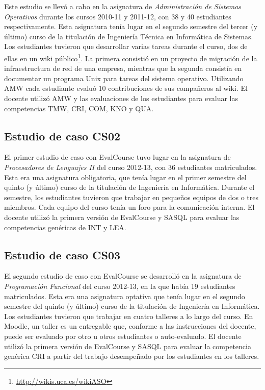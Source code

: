 		Este estudio se llevó a cabo en la asignatura de \emph{Administración de Sistemas Operativos} durante los cursos 2010-11 y 2011-12, con 38 y 40 estudiantes respectivamente. Esta asignatura tenía lugar en el segundo semestre del tercer (y último) curso de la titulación de Ingeniería Técnica en Informática de Sistemas. Los estudiantes tuvieron que desarrollar varias tareas durante el curso, dos de ellas en un wiki público\footnote{\url{http://wikis.uca.es/wikiASO}}. La primera consistió en un proyecto de migración de la infraestructura de red de una empresa, mientras que la segunda consistía en documentar un programa Unix para tareas del sistema operativo. Utilizando AMW cada estudiante evaluó 10 contribuciones de sus compañeros al wiki. El docente utilizó AMW y las evaluaciones de los estudiantes para evaluar las competencias TMW, CRI, COM, KNO y QUA.


	\subsection{Estudio de caso CS02}

		El primer estudio de caso con EvalCourse tuvo lugar en la asignatura de \emph{Procesadores de Lenguajes II} del curso 2012-13, con 36 estudiantes matriculados. Esta era una asignatura obligatoria, que tenía lugar en el primer semestre del quinto (y último) curso de la titulación de Ingeniería en Informática. Durante el semestre, los estudiantes tuvieron que trabajar en pequeños equipos de dos o tres miembros. Cada equipo del curso tenía un foro para la comunicación interna. El docente utilizó la primera versión de EvalCourse y SASQL para evaluar las competencias genéricas de INT y LEA.


	\subsection{Estudio de caso CS03}

		El segundo estudio de caso con EvalCourse se desarrolló en la asignatura de \emph{Programación Funcional} del curso 2012-13, en la que había 19 estudiantes matriculados. Esta era una asignatura optativa que tenía lugar en el segundo semestre del quinto (y último) curso de la titulación de Ingeniería en Informática. Los estudiantes tuvieron que trabajar en cuatro talleres a lo largo del curso. En Moodle, un taller es un entregable que, conforme a las instrucciones del docente, puede ser evaluado por otro u otros estudiantes o auto-evaluado. El docente utilizó la primera versión de EvalCourse y SASQL para evaluar la competencia genérica CRI a partir del trabajo desempeñado por los estudiantes en los talleres.

